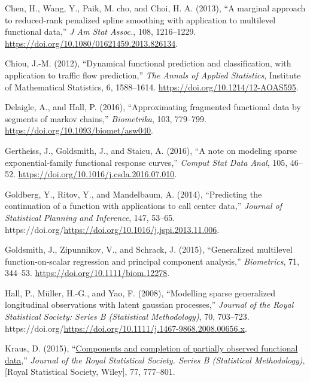 \documentclass[
  11pt,
]{article}
\newlength{\cslhangindent}
\newlength{\cslentryspacingunit} %
\newenvironment{CSLReferences}[2] %
 {%
  \setlength{\parindent}{0pt}
  \ifodd #1
  \let\oldpar\par
  \def\par{\hangindent=\cslhangindent\oldpar}
  \fi
  \setlength{\parskip}{#2\cslentryspacingunit}
 }%
 {}
\begin{document}
\begin{CSLReferences}{1}{0}
\leavevmode{}%
Chen, H., Wang, Y., Paik, M. cho, and Choi, H. A. (2013), {``A marginal
approach to reduced-rank penalized spline smoothing with application to
multilevel functional data,''} \emph{J Am Stat Assoc.}, 108, 1216--1229.
\url{https://doi.org/10.1080/01621459.2013.826134}.

\leavevmode{}%
Chiou, J.-M. (2012), {``Dynamical functional prediction and
classification, with application to traffic flow prediction,''}
\emph{The Annals of Applied Statistics}, Institute of Mathematical
Statistics, 6, 1588--1614. \url{https://doi.org/10.1214/12-AOAS595}.

\leavevmode{}%
Delaigle, A., and Hall, P. (2016), {``Approximating fragmented
functional data by segments of markov chains,''} \emph{Biometrika}, 103,
779--799. \url{https://doi.org/10.1093/biomet/asw040}.

\leavevmode{}%
Gertheiss, J., Goldsmith, J., and Staicu, A. (2016), {``A note on
modeling sparse exponential-family functional response curves,''}
\emph{Comput Stat Data Anal}, 105, 46--52.
\url{https://doi.org/10.1016/j.csda.2016.07.010}.

\leavevmode{}%
Goldberg, Y., Ritov, Y., and Mandelbaum, A. (2014), {``Predicting the
continuation of a function with applications to call center data,''}
\emph{Journal of Statistical Planning and Inference}, 147, 53--65.
https://doi.org/\url{https://doi.org/10.1016/j.jspi.2013.11.006}.

\leavevmode{}%
Goldsmith, J., Zipunnikov, V., and Schrack, J. (2015), {``Generalized
multilevel function-on-scalar regression and principal component
analysis,''} \emph{Biometrics}, 71, 344--53.
\url{https://doi.org/10.1111/biom.12278}.

\leavevmode{}%
Hall, P., Müller, H.-G., and Yao, F. (2008), {``Modelling sparse
generalized longitudinal observations with latent gaussian processes,''}
\emph{Journal of the Royal Statistical Society: Series B (Statistical
Methodology)}, 70, 703--723.
https://doi.org/\url{https://doi.org/10.1111/j.1467-9868.2008.00656.x}.

\leavevmode{}%
Kraus, D. (2015),
{``\href{http://www.jstor.org/stable/24775309}{Components and completion
of partially observed functional data},''} \emph{Journal of the Royal
Statistical Society. Series B (Statistical Methodology)}, {[}Royal
Statistical Society, Wiley{]}, 77, 777--801.


\end{CSLReferences}
\end{document}
